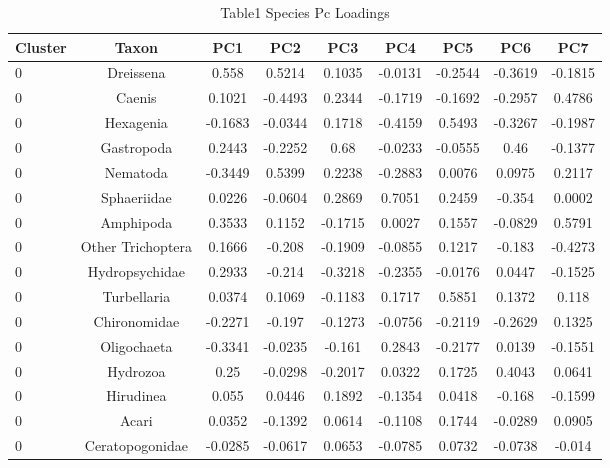 
\begin{table}[htbp]
    \centering
    \small
    \caption{Table1 Species Pc Loadings}
    \label{tab:table1_species_pc_loadings}
    \begin{tabular}{lcccccccc}
        \toprule
        Cluster & Taxon & PC1 & PC2 & PC3 & PC4 & PC5 & PC6 & PC7 \\
        \midrule
        0 & Dreissena & 0.558 & 0.5214 & 0.1035 & -0.0131 & -0.2544 & -0.3619 & -0.1815 \\
        0 & Caenis & 0.1021 & -0.4493 & 0.2344 & -0.1719 & -0.1692 & -0.2957 & 0.4786 \\
        0 & Hexagenia & -0.1683 & -0.0344 & 0.1718 & -0.4159 & 0.5493 & -0.3267 & -0.1987 \\
        0 & Gastropoda & 0.2443 & -0.2252 & 0.68 & -0.0233 & -0.0555 & 0.46 & -0.1377 \\
        0 & Nematoda & -0.3449 & 0.5399 & 0.2238 & -0.2883 & 0.0076 & 0.0975 & 0.2117 \\
        0 & Sphaeriidae & 0.0226 & -0.0604 & 0.2869 & 0.7051 & 0.2459 & -0.354 & 0.0002 \\
        0 & Amphipoda & 0.3533 & 0.1152 & -0.1715 & 0.0027 & 0.1557 & -0.0829 & 0.5791 \\
        0 & Other Trichoptera & 0.1666 & -0.208 & -0.1909 & -0.0855 & 0.1217 & -0.183 & -0.4273 \\
        0 & Hydropsychidae & 0.2933 & -0.214 & -0.3218 & -0.2355 & -0.0176 & 0.0447 & -0.1525 \\
        0 & Turbellaria & 0.0374 & 0.1069 & -0.1183 & 0.1717 & 0.5851 & 0.1372 & 0.118 \\
        0 & Chironomidae & -0.2271 & -0.197 & -0.1273 & -0.0756 & -0.2119 & -0.2629 & 0.1325 \\
        0 & Oligochaeta & -0.3341 & -0.0235 & -0.161 & 0.2843 & -0.2177 & 0.0139 & -0.1551 \\
        0 & Hydrozoa & 0.25 & -0.0298 & -0.2017 & 0.0322 & 0.1725 & 0.4043 & 0.0641 \\
        0 & Hirudinea & 0.055 & 0.0446 & 0.1892 & -0.1354 & 0.0418 & -0.168 & -0.1599 \\
        0 & Acari & 0.0352 & -0.1392 & 0.0614 & -0.1108 & 0.1744 & -0.0289 & 0.0905 \\
        0 & Ceratopogonidae & -0.0285 & -0.0617 & 0.0653 & -0.0785 & 0.0732 & -0.0738 & -0.014 \\

\end{tabular}
\end{table}
